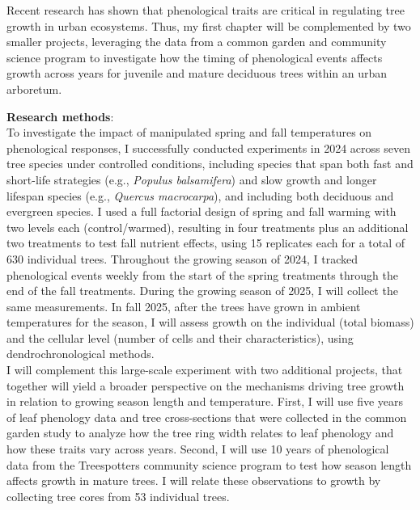 \documentclass[11pt,letter]{article}
\begin{document}
Recent research has shown that phenological traits are critical in regulating tree growth in urban ecosystems. \citep{simovic_functional_2024} Thus, my first chapter will be complemented by two smaller projects, leveraging the data from a common garden and community science program to investigate how the timing of phenological events affects growth across years for juvenile and mature deciduous trees within an urban arboretum. 
\par
\textbf{Research methods}: \\
To investigate the impact of manipulated spring and fall temperatures on phenological responses, I successfully conducted experiments in 2024 across seven tree species under controlled conditions, including species that span both fast and short-life strategies (e.g., \textit{Populus balsamifera}) and slow growth and longer lifespan species (e.g., \textit{Quercus macrocarpa}), and including both deciduous and evergreen species. \citep{jonsson_annual_2010}  I used a full factorial design of spring and fall warming with two levels each (control/warmed), resulting in four treatments plus an additional two treatments to test fall nutrient effects, using 15 replicates each for a total of 630 individual trees. Throughout the growing season of 2024, I tracked phenological events weekly from the start of the spring treatments through the end of the fall treatments. During the growing season of 2025, I will collect the same measurements. In fall 2025, after the trees have grown in ambient temperatures for the season, I will assess growth on the individual (total biomass) and the cellular level (number of cells and their characteristics), using dendrochronological methods.\\
I will complement this large-scale experiment with two additional projects, that together will yield a broader perspective on the mechanisms driving tree growth in relation to growing season length and temperature. First, I will use five years of leaf phenology data and tree cross-sections that were collected in the common garden study to analyze how the tree ring width relates to leaf phenology and how these traits vary across years. Second, I will use 10 years of phenological data from the Treespotters community science program to test how season length affects growth in mature trees. I will relate these observations to growth by collecting tree cores from 53 individual trees.  
\end{document}

